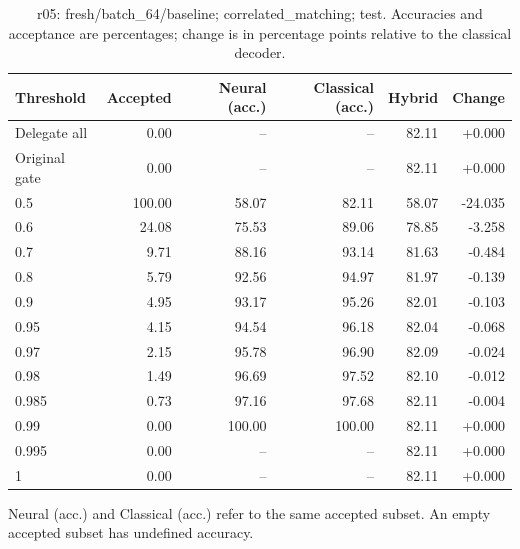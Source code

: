 \begin{table}[htbp]
\centering\small
\setlength{\tabcolsep}{3pt}
\caption{r05: fresh/batch\_64/baseline; correlated\_matching; test. Accuracies and acceptance are percentages; change is in percentage points relative to the classical decoder.}
\begin{tabular}{lrrrrr}
\toprule
Threshold & Accepted & Neural (acc.) & Classical (acc.) & Hybrid & Change \\
\midrule
Delegate all & 0.00 & -- & -- & 82.11 & +0.000 \\
Original gate & 0.00 & -- & -- & 82.11 & +0.000 \\
0.5 & 100.00 & 58.07 & 82.11 & 58.07 & -24.035 \\
0.6 & 24.08 & 75.53 & 89.06 & 78.85 & -3.258 \\
0.7 & 9.71 & 88.16 & 93.14 & 81.63 & -0.484 \\
0.8 & 5.79 & 92.56 & 94.97 & 81.97 & -0.139 \\
0.9 & 4.95 & 93.17 & 95.26 & 82.01 & -0.103 \\
0.95 & 4.15 & 94.54 & 96.18 & 82.04 & -0.068 \\
0.97 & 2.15 & 95.78 & 96.90 & 82.09 & -0.024 \\
0.98 & 1.49 & 96.69 & 97.52 & 82.10 & -0.012 \\
0.985 & 0.73 & 97.16 & 97.68 & 82.11 & -0.004 \\
0.99 & 0.00 & 100.00 & 100.00 & 82.11 & +0.000 \\
0.995 & 0.00 & -- & -- & 82.11 & +0.000 \\
1 & 0.00 & -- & -- & 82.11 & +0.000 \\
\bottomrule
\end{tabular}
\par\smallskip\footnotesize Neural (acc.) and Classical (acc.) refer to the same accepted subset. An empty accepted subset has undefined accuracy.
\end{table}
